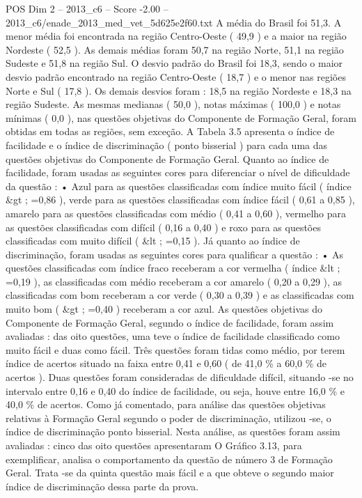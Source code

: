 \begin{textsample}{POS Dim 2 – 2013\_c6 – Score -2.00 – 2013\_c6/enade\_2013\_med\_vet\_5d625e2f60.txt}
A média do Brasil foi 51,3.
A menor média foi encontrada na região Centro-Oeste ( 49,9 ) e a maior na região Nordeste ( 52,5 ).
As demais médias foram 50,7 na região Norte, 51,1 na região Sudeste e 51,8 na região Sul.
O desvio padrão do Brasil foi 18,3, sendo o maior desvio padrão encontrado na região Centro-Oeste ( 18,7 ) e o menor nas regiões Norte e Sul ( 17,8 ).
Os demais desvios foram : 18,5 na região Nordeste e 18,3 na região Sudeste.
As mesmas medianas ( 50,0 ), notas máximas ( 100,0 ) e notas mínimas ( 0,0 ), nas questões objetivas do Componente de Formação Geral, foram obtidas em todas as regiões, sem exceção.
A Tabela 3.5 apresenta o índice de facilidade e o índice de discriminação ( ponto bisserial ) para cada uma das questões objetivas do Componente de Formação Geral.
Quanto ao índice de facilidade, foram usadas as seguintes cores para diferenciar o nível de dificuldade da questão : • Azul para as questões classificadas com índice muito fácil ( índice \&gt ; =0,86 ), verde para as questões classificadas com índice fácil ( 0,61 a 0,85 ), amarelo para as questões classificadas com médio ( 0,41 a 0,60 ), vermelho para as questões classificadas com difícil ( 0,16 a 0,40 ) e roxo para as questões classificadas com muito difícil ( \&lt ; =0,15 ).
Já quanto ao índice de discriminação, foram usadas as seguintes cores para qualificar a questão : • As questões classificadas com índice fraco receberam a cor vermelha ( índice \&lt ; =0,19 ), as classificadas com médio receberam a cor amarelo ( 0,20 a 0,29 ), as classificadas com bom receberam a cor verde ( 0,30 a 0,39 ) e as classificadas com muito bom ( \&gt ; =0,40 ) receberam a cor azul.
As questões objetivas do Componente de Formação Geral, segundo o índice de facilidade, foram assim avaliadas : das oito questões, uma teve o índice de facilidade classificado como muito fácil e duas como fácil.
Três questões foram tidas como médio, por terem índice de acertos situado na faixa entre 0,41 e 0,60 ( de 41,0 \% a 60,0 \% de acertos ).
Duas questões foram consideradas de dificuldade difícil, situando -se no intervalo entre 0,16 e 0,40 do índice de facilidade, ou seja, houve entre 16,0 \% e 40,0 \% de acertos.
Como já comentado, para análise das questões objetivas relativas à Formação Geral segundo o poder de discriminação, utilizou -se, o índice de discriminação ponto bisserial.
Nesta análise, as questões foram assim avaliadas : cinco das oito questões apresentaram O Gráfico 3.13, para exemplificar, analisa o comportamento da questão de número 3 de Formação Geral.
Trata -se da quinta questão mais fácil e a que obteve o segundo maior índice de discriminação dessa parte da prova.

\end{textsample}
